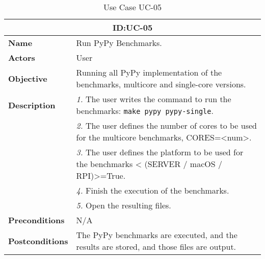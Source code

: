 \begin{table}[H]
    \centering
    \begin{tabular}{l p{10cm}}
        \toprule
        \multicolumn{2}{c}{\textbf{ID:\@ UC-05}} \\
        \toprule
        \textbf{Name}                         &  Run PyPy Benchmarks. \\
        \textbf{Actors}                       &  User \\
        \textbf{Objective}                    &  Running all PyPy implementation of the benchmarks, multicore and single-core versions. \\
        \multirow{1}{*}{\textbf{Description}} & \textsl{1.} The user writes the command to run the benchmarks: \texttt{make pypy pypy-single}.\\
                                              & \textsl{2.} The user defines the number of cores to be used for the multicore benchmarks, CORES=<num>.\\
                                              & \textsl{3.} The user defines the platform to be used for the benchmarks < (SERVER / macOS / RPI)>=True.\\
                                              & \textsl{4.} Finish the execution of the benchmarks.\\
                                              & \textsl{5.} Open the resulting files.\\
        \textbf{Preconditions}                &  N/A \\
        \textbf{Postconditions}               &  The PyPy benchmarks are executed, and the results are stored, and those files are output. \\
    \end{tabular}
    \caption{Use Case UC-05}\label{tab:uc-05}
\end{table}


